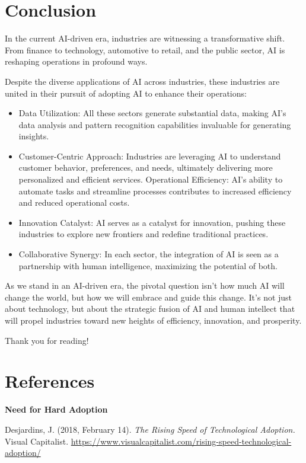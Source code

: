 \documentclass[
]{article}
\providecommand{\tightlist}{%
  \setlength{\itemsep}{0pt}\setlength{\parskip}{0pt}}
\begin{document}
\hypertarget{conclusion}{%
\section{Conclusion}\label{conclusion}}

In the current AI-driven era, industries are witnessing a transformative shift. From finance to technology, automotive to retail, and the public sector, AI is reshaping operations in profound ways.

Despite the diverse applications of AI across industries, these industries are united in their pursuit of adopting AI to enhance their operations:

\begin{itemize}
\tightlist
\item
  Data Utilization: All these sectors generate substantial data, making AI's data analysis and pattern recognition capabilities invaluable for generating insights.
\item
  Customer-Centric Approach: Industries are leveraging AI to understand customer behavior, preferences, and needs, ultimately delivering more personalized and efficient services.
  Operational Efficiency: AI's ability to automate tasks and streamline processes contributes to increased efficiency and reduced operational costs.
\item
  Innovation Catalyst: AI serves as a catalyst for innovation, pushing these industries to explore new frontiers and redefine traditional practices.
\item
  Collaborative Synergy: In each sector, the integration of AI is seen as a partnership with human intelligence, maximizing the potential of both.
\end{itemize}

As we stand in an AI-driven era, the pivotal question isn't how much AI will change the world, but how we will embrace and guide this change. It's not just about technology, but about the strategic fusion of AI and human intellect that will propel industries toward new heights of efficiency, innovation, and prosperity.

Thank you for reading!

\hypertarget{references}{%
\section{References}\label{references}}

\textbf{Need for Hard Adoption}

Desjardins, J. (2018, February 14). \emph{The Rising Speed of Technological Adoption.} Visual Capitalist. \url{https://www.visualcapitalist.com/rising-speed-technological-adoption/}
\end{document}
